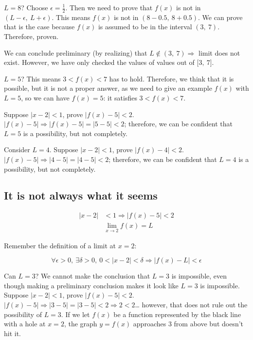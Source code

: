 \documentclass[12pt]{article}
\theoremstyle{plain}
\theoremstyle{remark}
\theoremstyle{definition}
\begin{document}
\(L = 8\)? Choose \(\epsilon = \frac{1}{2}\). Then we need to prove that
\(f(x)\) is not in \((L - \epsilon,\ L + \epsilon)\). This means
\(f(x)\) is not in \((8 - 0.5,\ 8 + 0.5)\). We can prove that is the
case because \(f(x)\) is assumed to be in the interval \((3,\ 7)\).
Therefore, proven.

We can conclude preliminary (by realizing) that
\(L \notin (3,\ 7) \Rightarrow\) limit does not exist. However, we have
only checked the values of values out of \(\lbrack 3,\ 7\rbrack\).

\(L = 5\)? This means \(3 < f(x) < 7\) has to hold. Therefore, we think
that it is possible, but it is not a proper answer, as we need to give
an example \(f(x)\) with \(L = 5\), so we can have \(f(x) = 5\): it
satisfies \(3 < f(x) < 7\).

Suppose \(|x - 2| < 1\), prove \(\left| f(x) - 5 \right| < 2\).
\(\left| f(x) - 5 \right| \Rightarrow \left| f(x) - 5 \right| = |5 - 5| < 2\);
therefore, we can be confident that \(L = 5\) is a possibility, but not
completely.

Consider \(L = 4\). Suppose \(|x - 2| < 1\), prove
\(\left| f(x) - 4 \right| < 2\).
\(\left| f(x) - 5 \right| \Rightarrow |4 - 5| = |4 - 5| < 2\);
therefore, we can be confident that \(L = 4\) is a possibility, but not
completely.


\subsection{It is not always what it
seems}

\begin{align*}
|x - 2| &< 1 \Rightarrow \left| f(x) - 5 \right| < 2 \\
&\lim_{x \rightarrow 2}{f(x) = L}
\end{align*}


Remember the definition of a limit at \(x = 2\):

\[\forall\epsilon > 0,\ \exists\delta > 0,\ 0 < |x - 2| < \delta \Rightarrow |f(x) - L| < \epsilon\]

Can \(L = 3\)? We cannot make the conclusion that \(L = 3\) is
impossible, even though making a preliminary conclusion makes it look
like \(L = 3\) is impossible. Suppose \(|x - 2| < 1\), prove
\(\left| f(x) - 5 \right| < 2\).
\(\left| f(x) - 5 \right| \Rightarrow |3 - 5| = |3 - 5| < 2 \Rightarrow 2 < 2\)\ldots{}
however, that does not rule out the possibility of \(L = 3\). If we let
\(f(x)\) be a function represented by the black line with a hole at
\(x = 2\), the graph \(y = f(x)\) approaches 3 from above but doesn't
hit it.
\end{document}

